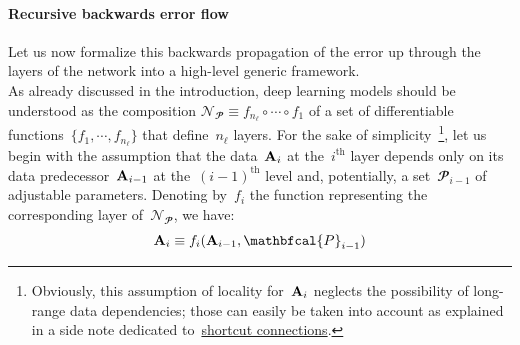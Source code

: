 \documentclass{article}
\begin{document}
\paragraph{Recursive backwards error flow} Let us now formalize this backwards propagation of the error up through the layers of the network into a high-level generic framework. \\

\noindent As already discussed in the introduction, deep learning models should be understood as the composition $\mathcal{N}_\mathbfcal{P} \equiv f_{n_\ell} \circ \cdots \circ f_1$ of a set of differentiable functions~$\{ f_1, \cdots , f_{n_\ell} \}$ that define~$n_\ell$ layers. For the sake of simplicity~\footnote{Obviously, this assumption of locality for~${\bf A}_i$ neglects the possibility of long-range data dependencies; those can easily be taken into account as explained in a side note dedicated to~\hyperlink{skipNote}{shortcut connections}.}, let us begin with the assumption that the data~${\bf A}_i$ at the~$i^\text{th}$ layer depends only on its data predecessor~${\bf A}_{i-1}$ at the~$(i-1)^\text{th}$ level and, potentially, a set~$\mathbfcal{P}_{i-1}$ of adjustable parameters.  Denoting by~$f_i$ the function representing the corresponding layer of~$\mathcal{N}_\mathbfcal{P}$, we have: 
\begin{equation}
{\bf A}_i \equiv f_i ( {\bf A}_{i-1}, \mathbfcal{P}_{i-1} )
\label{eq:simpleDep}
\end{equation}

\newpage
\end{document}
